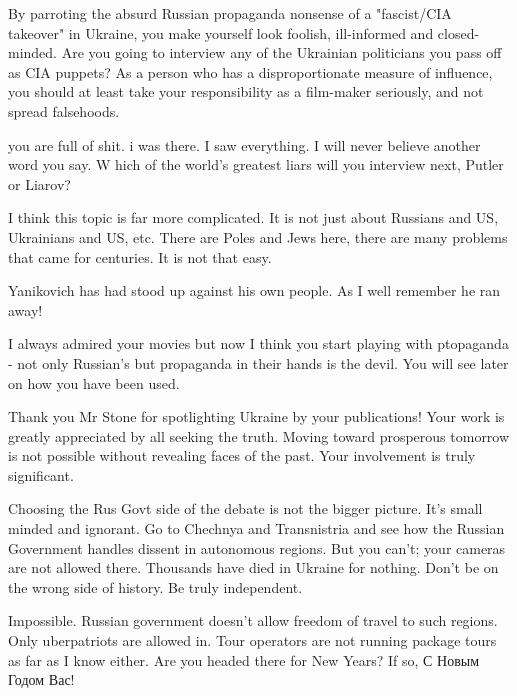 \begin{itemize}
\begin{itemize}
\end{itemize} %


By parroting the absurd Russian propaganda nonsense of a "fascist/CIA takeover"
in Ukraine, you make yourself look foolish, ill-informed and closed-minded. Are
you going to interview any of the Ukrainian politicians you pass off as CIA
puppets? As a person who has a disproportionate measure of influence, you
should at least take your responsibility as a film-maker seriously, and not
spread falsehoods.


you are full of shit. i was there. I saw everything. I will never believe
another word you say. W hich of the world's greatest liars will you interview
next, Putler or Liarov?



I think this topic is far more complicated. It is not just about Russians and
US, Ukrainians and US, etc. There are Poles and Jews here, there are many
problems that came for centuries. It is not that easy.

Yanikovich has had stood up against his own people. As I well remember he ran away!

I always admired your movies but now I think you start playing with ptopaganda
- not only Russian's but propaganda in their hands is the devil. You will see
later on how you have been used.



Thank you Mr Stone for spotlighting Ukraine by your publications! Your work is
greatly appreciated by all seeking the truth. Moving toward prosperous tomorrow
is not possible without revealing faces of the past. Your involvement is truly
significant.


Choosing the Rus Govt side of the debate is not the bigger picture. It's small
minded and ignorant. Go to Chechnya and Transnistria and see how the Russian
Government handles dissent in autonomous regions. But you can't; your cameras
are not allowed there. Thousands have died in Ukraine for nothing. Don't be on
the wrong side of history. Be truly independent.

\begin{itemize} %

Impossible. Russian government doesn't allow freedom of travel to such regions.
Only uberpatriots are allowed in. Tour operators are not running package tours
as far as I know either. Are you headed there for New Years? If so, С Новым
Годом Вас!


\end{itemize}
\end{itemize}
